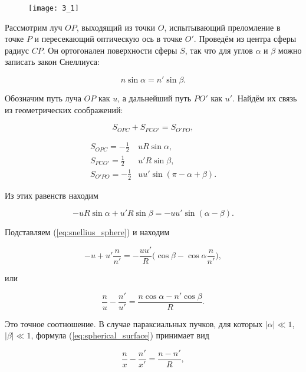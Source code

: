 \begin{figure}[H]
	\centering
	\texttt{[image: 3\_1]}
\end{figure}


Рассмотрим луч $OP$, выходящий из точки $O$, испытывающий преломление в точке $P$ и пересекающий оптическую ось в точке $O'$. Проведём из центра сферы радиус $CP$. Он ортогонален поверхности сферы $S$, так что для углов $\alpha$ и $\beta$ можно записать закон Снеллиуса:

\begin{equation}
n \sin{\alpha} = n' \sin{\beta}.
\label{eq:snellius_sphere}
\end{equation} 

Обозначим путь луча $OP$ как $u$, а дальнейший путь $PO'$ как $u'$. Найдём их связь из геометрических соображений:

\begin{equation*}
S_{OPC} + S_{PCO'} = S_{O'PO},
\end{equation*}

\begin{align*}
S_{OPC} = -\frac{1}{2}& uR \sin{\alpha}, \\ 
S_{PCO'} = \frac{1}{2}&u'R\sin{\beta}, \\
S_{O'PO} = -\frac{1}{2}&uu'\sin{(\pi - \alpha + \beta).}
\end{align*} 

Из этих равенств находим

\begin{equation*}
-uR\sin{\alpha} + u'R\sin{\beta} = -uu'\sin{(\alpha - \beta).}
\end{equation*}

Подставляем (\ref{eq:snellius_sphere}) и находим

\begin{equation*}
-u + u'\frac{n}{n'} = -\frac{uu'}{R}\Big(\cos{\beta} - \cos{\alpha} \frac{n}{n'}\Big),
\end{equation*}

или

\begin{equation}
\frac{n}{u} - \frac{n'}{u'} = \frac{n\cos{\alpha} - n'\cos{\beta}}{R}.
\label{eq:spherical_surface}
\end{equation}

Это точное соотношение. В случае параксиальных пучков, для которых $|\alpha| \ll 1$, $|\beta| \ll 1$, формула (\ref{eq:spherical_surface}) принимает вид

\begin{equation}
\frac{n}{x} - \frac{n'}{x'} = \frac{n - n'}{R},
\label{eq:spherical_surface1}
\end{equation}

